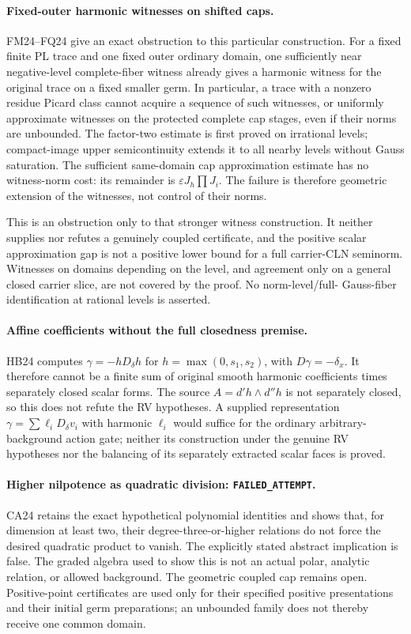 \paragraph{Fixed-outer harmonic witnesses on shifted caps.}
FM24--FQ24 give an exact obstruction to this particular construction.
For a fixed finite PL trace and one fixed outer ordinary domain,
one sufficiently near negative-level complete-fiber
witness already gives a harmonic witness for the original trace
on a fixed smaller germ.  In particular, a trace with a nonzero
residue Picard class cannot acquire a sequence of such witnesses,
or uniformly approximate witnesses on the protected complete cap
stages, even if their norms are unbounded.  The factor-two estimate
is first proved on irrational levels; compact-image upper
semicontinuity extends it to all nearby levels without Gauss
saturation.  The sufficient same-domain
cap approximation estimate has no witness-norm cost: its remainder
is \(\varepsilon J_h\prod J_i\).  The failure is therefore
geometric extension of the witnesses, not control of their norms.

This is an obstruction only to that stronger witness construction.
It neither supplies nor refutes a genuinely coupled certificate,
and the positive scalar approximation gap is not a positive lower
bound for a full carrier-CLN seminorm.  Witnesses on domains
depending on the level, and agreement only on a general closed
carrier slice, are not covered by the proof.  No norm-level/full-
Gauss-fiber identification at rational levels is asserted.

\paragraph{Affine coefficients without the full closedness premise.}
HB24 computes \(\gamma=-hD_\delta h\) for
\(h=\max(0,s_1,s_2)\), with \(D\gamma=-\delta_x\).
It therefore cannot be a finite sum of original smooth harmonic
coefficients times separately closed scalar forms.  The source
\(A=d'h\wedge d''h\) is not separately closed, so this does
not refute the RV hypotheses.  A supplied representation
\(\gamma=\sum\ell_iD_\delta v_i\) with harmonic \(\ell_i\)
would suffice for the ordinary arbitrary-background action gate;
neither its construction under the genuine RV hypotheses nor
the balancing of its separately extracted scalar faces is proved.

\paragraph{Higher nilpotence as quadratic division:
\texttt{FAILED\_ATTEMPT}.}
CA24 retains the exact hypothetical polynomial identities and
shows that, for dimension at least two, their degree-three-or-higher
relations do not force the desired quadratic product to vanish.
The explicitly stated abstract implication is false.  The graded
algebra used to show this is not an actual polar, analytic relation,
or allowed background.  The geometric coupled cap remains open.
Positive-point certificates are used only for their specified
positive presentations and their initial germ preparations;
an unbounded family does not thereby receive one common domain.

